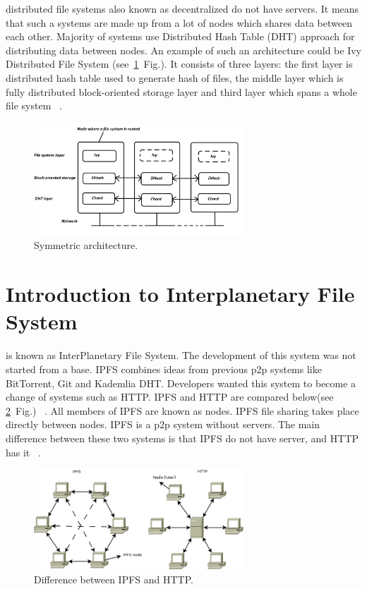 \documentclass[a4paper,12pt,fleqn]{article}
\begin{document}
 distributed file systems also known as decentralized do not have servers. It means that such a systems are made up from a lot of nodes which shares data between each other. Majority of systems use Distributed Hash Table (DHT) approach for distributing data between nodes. An example of such an architecture could be Ivy Distributed File System (see\ \ref{pav04}~Fig.). It consists of three layers: the first layer is distributed hash table used to generate hash of files, the middle layer which is fully distributed block-oriented storage layer and third layer which spans a whole file system ~\cite{levy1990distributed}.

\begin{figure}[ht!]
    \centering
    \includegraphics[clip=true, width=0.7\textwidth]{Ivy_DFS.PNG}
    \caption{Symmetric architecture.}
    \label{pav04}
\end{figure}


\section{Introduction to Interplanetary File System}

 is known as InterPlanetary File System. The development of this system was not started from a base. IPFS combines ideas from previous p2p systems like BitTorrent, Git and Kademlia DHT. Developers wanted this system to become a change of systems such as HTTP. IPFS and HTTP are compared below(see \ref{pav05}~Fig.) ~\cite{PVipfs}. All members of IPFS are known as nodes. IPFS file sharing takes place directly between nodes. IPFS is a p2p system without servers. The main difference between these two systems is that IPFS do not have server, and HTTP has it ~\cite{benet2014ipfs}.

\begin{figure}[ht!]
    \centering
    \includegraphics[clip=true, width=0.7\textwidth]{ipfsVShttp.PNG}
    \caption{Difference between IPFS and HTTP.}
    \label{pav05}
\end{figure}
\end{document}
